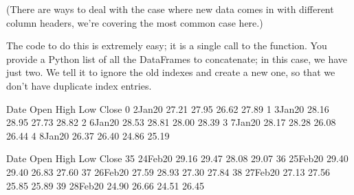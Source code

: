 \documentclass[letterpaper,10pt,english]{sphinxmanual}
\begin{document}
(There are ways to deal with the case where new data comes in with different column headers, we’re covering the most common case here.)

The code to do this is extremely easy; it is a single call to the  function.  You provide a Python list of all the DataFrames to concatenate; in this case, we have just two.  We tell it to ignore the old indexes and create a new one, so that we don’t have duplicate index entries.

\begin{sphinxVerbatim}[commandchars=\\\{\}]
   

    
    

   \PYG{p}{[}   \PYG{p}{]}  
\end{sphinxVerbatim}

\begin{sphinxVerbatim}[commandchars=\\\{\}]
       Date   Open   High    Low  Close
0  2\PYGZhy{}Jan\PYGZhy{}20  27.21  27.95  26.62  27.89
1  3\PYGZhy{}Jan\PYGZhy{}20  28.16  28.95  27.73  28.82
2  6\PYGZhy{}Jan\PYGZhy{}20  28.53  28.81  28.00  28.39
3  7\PYGZhy{}Jan\PYGZhy{}20  28.17  28.28  26.08  26.44
4  8\PYGZhy{}Jan\PYGZhy{}20  26.37  26.40  24.86  25.19
\end{sphinxVerbatim}

\begin{sphinxVerbatim}[commandchars=\\\{\}]
\end{sphinxVerbatim}

\begin{sphinxVerbatim}[commandchars=\\\{\}]
         Date   Open   High    Low  Close
35  24\PYGZhy{}Feb\PYGZhy{}20  29.16  29.47  28.08  29.07
36  25\PYGZhy{}Feb\PYGZhy{}20  29.40  29.40  26.83  27.60
37  26\PYGZhy{}Feb\PYGZhy{}20  27.59  28.93  27.30  27.84
38  27\PYGZhy{}Feb\PYGZhy{}20  27.13  27.56  25.85  25.89
39  28\PYGZhy{}Feb\PYGZhy{}20  24.90  26.66  24.51  26.45
\end{sphinxVerbatim}
\end{document}
